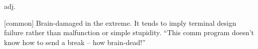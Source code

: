  adj.

[common] Brain-damaged in the extreme. It tends to imply terminal design failure
rather than malfunction or simple stupidity. ``This comm program doesn't know
how to send a break -- how brain-dead!''

